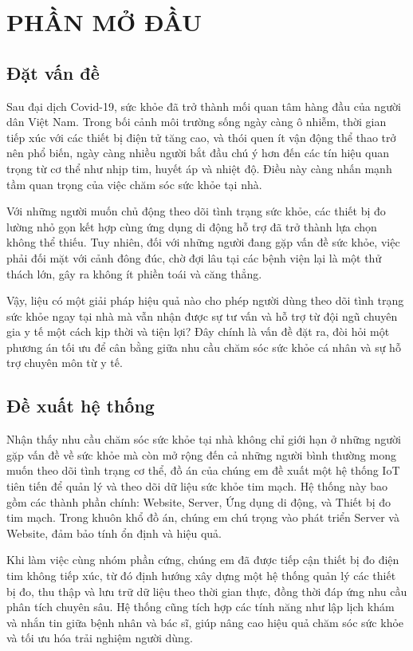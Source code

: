 
\section*{PHẦN MỞ ĐẦU}
\subsection*{Đặt vấn đề} 

Sau đại dịch Covid-19, sức khỏe đã trở thành mối quan tâm hàng đầu của người dân Việt Nam. Trong bối cảnh môi trường sống ngày càng ô nhiễm, thời gian tiếp xúc với các thiết bị điện tử tăng cao, và thói quen ít vận động thể thao trở nên phổ biến, ngày càng nhiều người bắt đầu chú ý hơn đến các tín hiệu quan trọng từ cơ thể như nhịp tim, huyết áp và nhiệt độ. Điều này càng nhấn mạnh tầm quan trọng của việc chăm sóc sức khỏe tại nhà.

Với những người muốn chủ động theo dõi tình trạng sức khỏe, các thiết bị đo lường nhỏ gọn kết hợp cùng ứng dụng di động hỗ trợ đã trở thành lựa chọn không thể thiếu. Tuy nhiên, đối với những người đang gặp vấn đề sức khỏe, việc phải đối mặt với cảnh đông đúc, chờ đợi lâu tại các bệnh viện lại là một thử thách lớn, gây ra không ít phiền toái và căng thẳng.

Vậy, liệu có một giải pháp hiệu quả nào cho phép người dùng theo dõi tình trạng sức khỏe ngay tại nhà mà vẫn nhận được sự tư vấn và hỗ trợ từ đội ngũ chuyên gia y tế một cách kịp thời và tiện lợi? Đây chính là vấn đề đặt ra, đòi hỏi một phương án tối ưu để cân bằng giữa nhu cầu chăm sóc sức khỏe cá nhân và sự hỗ trợ chuyên môn từ y tế.

\subsection*{Đề xuất hệ thống}


Nhận thấy nhu cầu chăm sóc sức khỏe tại nhà không chỉ giới hạn ở những người gặp vấn đề về sức khỏe mà còn mở rộng đến cả những người bình thường mong muốn theo dõi tình trạng cơ thể, đồ án của chúng em đề xuất một hệ thống IoT tiên tiến để quản lý và theo dõi dữ liệu sức khỏe tim mạch. Hệ thống này bao gồm các thành phần chính: Website, Server, Ứng dụng di động, và Thiết bị đo tim mạch.
Trong khuôn khổ đồ án, chúng em chú trọng vào phát triển Server và Website, đảm bảo tính ổn định và hiệu quả.

Khi làm việc cùng nhóm phần cứng, chúng em đã được tiếp cận thiết bị đo điện tim không tiếp xúc, từ đó định hướng xây dựng một hệ thống quản lý các thiết bị đo, thu thập và lưu trữ dữ liệu theo thời gian thực, đồng thời đáp ứng nhu cầu phân tích chuyên sâu. Hệ thống cũng tích hợp các tính năng như lập lịch khám và nhắn tin giữa bệnh nhân và bác sĩ, giúp nâng cao hiệu quả chăm sóc sức khỏe và tối ưu hóa trải nghiệm người dùng.

